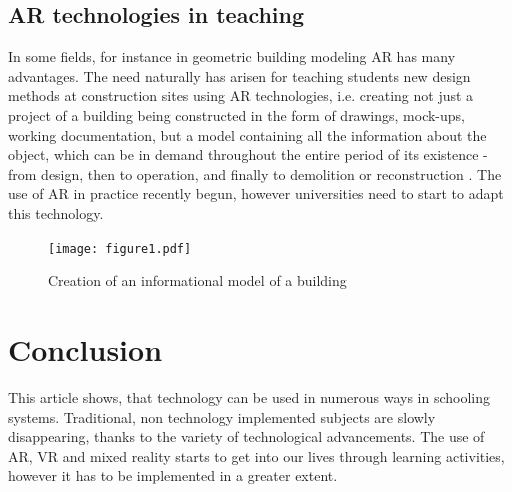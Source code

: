 \documentclass[10pt,oneside,english,a4paper]{article}
\begin{document}
\subsection{AR technologies in teaching}\label{5.2}

	 In some fields, for instance in geometric building modeling AR has many advantages. The need naturally has arisen for teaching students new design methods at construction sites using AR technologies, i.e. creating not just a project of a building being constructed in the form of drawings, mock-ups, working documentation, but a model containing all the information about the object, which can be in demand throughout the entire period of its existence - from design, then to operation, and finally to demolition or reconstruction \cite{Tretyakova2019}. The use of AR in practice recently begun, however universities need to start to adapt this technology. 

\begin{figure}[tbh!]
\centering
\texttt{[image: figure1.pdf]}
\caption{Creation of an informational model of a building\cite{Tretyakova2019}}
\label{f:rozhod}
\end{figure}

\section{Conclusion}

	This article shows, that technology can be used in numerous ways in schooling systems. Traditional, non technology implemented subjects are slowly disappearing, thanks to the variety of technological advancements. The use of AR, VR and mixed reality starts to get into our lives through learning activities, however it has to be implemented in a greater extent.






\end{document}
